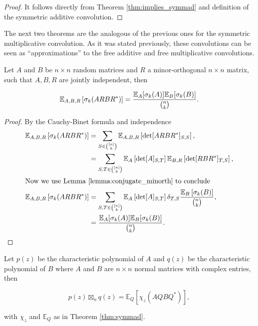 \begin{proof}
    It follows directly from Theorem \ref{thm:implies_symmad} and definition of the symmetric additive convolution.
\end{proof}


The next two theorems are the analogous of the previous ones for the symmetric multiplicative convolution. As it was stated previously, these convolutions can be seen as ``approximations'' to the free additive and free multiplicative convolutions.


\begin{theorem} \label{thm:implies_symm_mult}
    Let $A$ and $B$ be $n\times n$ random matrices and $R$ a minor-orthogonal $n\times n$ matrix, such that $A,B,R$ are jointly independent, then

    \begin{equation*}
        \mathbb E_{A,B,R} \left[\sigma_k(ARBR^*)\right] = \frac{\mathbb E_A[\sigma_k(A)]\mathbb E_B[\sigma_k(B)]}{\binom{n}{k}}.
    \end{equation*}
\end{theorem}

\begin{proof}
By the Cauchy-Binet formula and independence
    \begin{align*}
        \mathbb E_{A,B,R} \left[\sigma_k(ARBR^*)\right] &= \sum_{S \in \binom{[n]}{k}} \mathbb E_{A,B,R} \left[\det[ARBR^*]_{S,S}\right],\\ 
        &= \sum_{S,T \in \binom{[n]}{k}} \mathbb E_A\left[ \det[A]_{S,T} \right] \mathbb E_{B,R} \left[ \det [RBR^*]_{T,S} \right],\\ 
        \intertext{Now we use Lemma \ref{lemma:conjugate_minorth} to conclude}
        \mathbb E_{A,B,R} \left[\sigma_k(ARBR^*)\right] &= \sum_{S,T \in \binom{[n]}{k}} \mathbb E_A\left[\det[A]_{S,T} \right] \delta_{T,S}\frac{\mathbb E_B\left[ \sigma_k(B)\right]}{\binom{n}{k}},\\
        &= \frac{\mathbb E_A[\sigma_k(A)]\mathbb E_B[\sigma_k(B)]}{\binom{n}{k}}.
    \end{align*}
\end{proof}


\begin{theorem}
    Let $p(z)$ be the characteristic polynomial of $A$ and $q(z)$ be the characteristic polynomial of $B$ where $A$ and $B$ are $n\times n$ normal matrices with complex entries, then 

    \begin{equation*}
        p(z) \boxtimes_n q(z) = \mathbb E_Q \left[ \chi_z (AQBQ^*) \right],
    \end{equation*}

    \noindent with $\chi_z$ and $\mathbb E_Q$ as in Theorem \ref{thm:symmad}.
\end{theorem}


